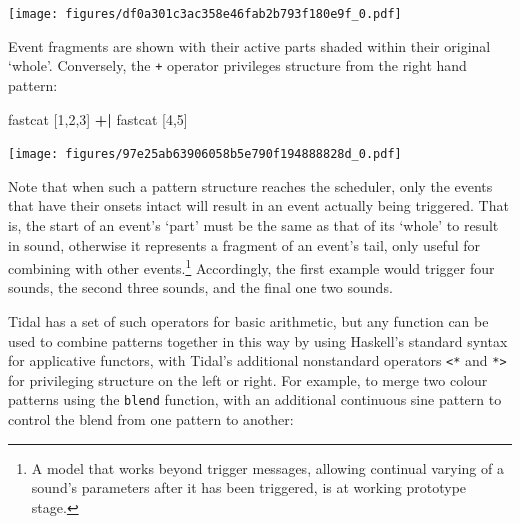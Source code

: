 \documentclass{nime-alternate} %
\newenvironment{Shaded}{\begin{snugshade}}{\end{snugshade}}
\newcommand{\DecValTok}[1]{\textcolor[rgb]{0.00,0.00,0.81}{#1}}
\newcommand{\NormalTok}[1]{#1}
\newcommand{\OperatorTok}[1]{\textcolor[rgb]{0.81,0.36,0.00}{\textbf{#1}}}
\newcommand{\StringTok}[1]{\textcolor[rgb]{0.31,0.60,0.02}{#1}}
\begin{document}
\texttt{[image: figures/df0a301c3ac358e46fab2b793f180e9f\_0.pdf]}

Event fragments are shown with their active parts shaded within their
original `whole'. Conversely, the \texttt{+\textbar{}} operator
privileges structure from the right hand pattern:

\begin{Shaded}
\begin{Highlighting}[]
\NormalTok{fastcat [}\DecValTok{1}\NormalTok{,}\DecValTok{2}\NormalTok{,}\DecValTok{3}\NormalTok{] }\OperatorTok{+|}\NormalTok{ fastcat [}\DecValTok{4}\NormalTok{,}\DecValTok{5}\NormalTok{]}
\end{Highlighting}
\end{Shaded}

\texttt{[image: figures/97e25ab63906058b5e790f194888828d\_0.pdf]}

Note that when such a pattern structure reaches the scheduler, only the
events that have their onsets intact will result in an event actually
being triggered. That is, the start of an event's `part' must be the
same as that of its `whole' to result in sound, otherwise it represents
a fragment of an event's tail, only useful for combining with other
events.\footnote{A model that works beyond trigger messages, allowing
  continual varying of a sound's parameters after it has been triggered,
  is at working prototype stage.} Accordingly, the first example would
trigger four sounds, the second three sounds, and the final one two
sounds.

Tidal has a set of such operators for basic arithmetic, but any function
can be used to combine patterns together in this way by using Haskell's
standard syntax for applicative functors, with Tidal's additional
nonstandard operators \texttt{\textless{}*} and \texttt{*\textgreater{}}
for privileging structure on the left or right. For example, to merge
two colour patterns using the \texttt{blend} function, with an
additional continuous sine pattern to control the blend from one pattern
to another:

\begin{Shaded}
\end{Shaded}
\end{document}

